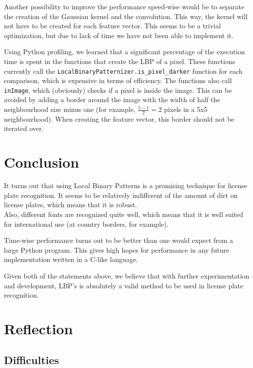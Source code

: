 \documentclass[a4paper]{article}
\begin{document}
Another possibility to improve the performance speed-wise would be to separate
the creation of the Gaussian kernel and the convolution. This way, the kernel
will not have to be created for each feature vector. This seems to be a trivial
optimization, but due to lack of time we have not been able to implement it.

Using Python profiling, we learned that a significant percentage of the
execution time is spent in the functions that create the LBP of a pixel. These
functions currently call the \texttt{LocalBinaryPatternizer.is\_pixel\_darker}
function for each comparison, which is expensive in terms of efficiency. The
functions also call \texttt{inImage}, which (obviously) checks if a pixel is
inside the image. This can be avoided by adding a border around the image with
the width of half the neighbourhood size minus one (for example, $\frac{5 -
1}{2} = 2$ pixels in a 5x5 neighbourhood). When creating the feature vector,
this border should not be iterated over.

\section{Conclusion}

It turns out that using Local Binary Patterns is a promising technique for
license plate recognition. It seems to be relatively indifferent of the amount
of dirt on license plates, which means that it is robust. \\
Also, different fonts are recognized quite well, which means that it is well
suited for international use (at country borders, for example).

Time-wise performance turns out to be better than one would expect from a large
Python program. This gives high hopes for performance in any future
implementation written in a C-like language.

Given both of the statements above, we believe that with further
experimentation and development, LBP's is absolutely a valid method to be used
in license plate recognition.

\section{Reflection}

\subsection{Difficulties}
\end{document}
